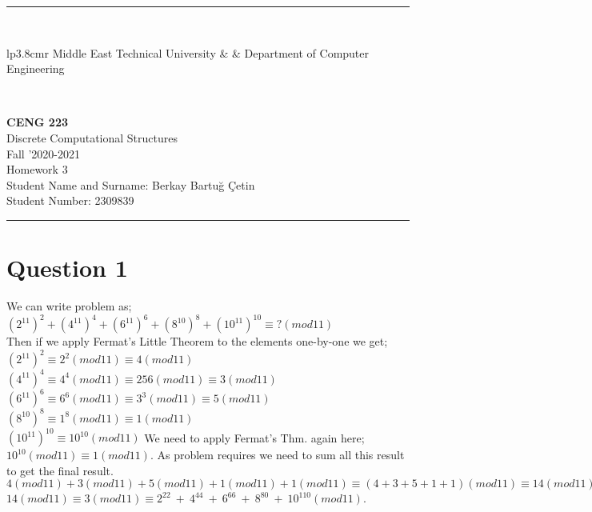 \documentclass[12pt]{article}
\newcommand{\HRule}{\rule{\linewidth}{1mm}}
\begin{document}
\noindent
\HRule \\[3mm]
\small
\begin{tabular}[b]{lp{3.8cm}r}
{} Middle East Technical University &  &
{} Department of Computer Engineering \\
\end{tabular} \\
\begin{center}

                 \LARGE \textbf{CENG 223} \\[4mm]
                 \Large Discrete Computational Structures \\[4mm]
                \normalsize Fall '2020-2021 \\
                    \Large Homework 3 \\
                \normalsize Student Name and Surname: Berkay Bartuğ Çetin \\
                \normalsize Student Number: 2309839 \\
\end{center}
\HRule


\section*{Question 1}
We can write problem as; $\left(2^{11}\right)^2+\left(4^{11}\right)^4+\left(6^{11}\right)^6+\left(8^{10}\right)^8+\left(10^{11}\right)^{10} \equiv ?(mod11)$ \\
Then if we apply Fermat's Little Theorem to the elements one-by-one we get; \\
$\left(2^{11}\right)^2 \equiv 2^2(mod11) \equiv 4(mod11)$ \\
$\left(4^{11}\right)^4 \equiv 4^4(mod11) \equiv 256(mod11) \equiv 3(mod11)$ \\
$\left(6^{11}\right)^6 \equiv 6^6(mod11) \equiv 3^3(mod11) \equiv 5(mod11)$ \\
$\left(8^{10}\right)^8 \equiv 1^8(mod11) \equiv 1(mod11)$ \\
$\left(10^{11}\right)^{10} \equiv 10^{10}(mod11)$ We need to apply Fermat's Thm. again here; \\
$10^{10}(mod11) \equiv 1(mod11)$. As problem requires we need to sum all this result to get the final result. \\
$4(mod11)+3(mod11)+5(mod11)+1(mod11)+1(mod11)\equiv (4+3+5+1+1)(mod11)\equiv 14(mod11)$ \\
$14(mod11)\equiv 3(mod11)\equiv2^{22}\:+\:4^{44}\:+\:6^{66}\:+\:8^{80}\:+\:10^{110}(mod11)$. \\
\end{document}
